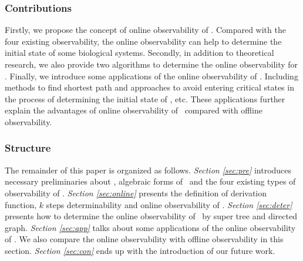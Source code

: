 \subsubsection*{Contributions}
Firstly, we propose the concept of online observability of \BCNs. Compared with the four existing observability, the online observability can help to determine the initial state of some biological systems. Secondly, in addition to theoretical research, we also provide two algorithms to determine the online observability for \BCNs. Finally, we introduce some applications of the online observability of \BCNs. Including methods to find shortest path and approaches to avoid entering critical states in the process of determining the initial state of \BCNs, etc.  These applications further explain the advantages of online observability of \BCNs\ compared with offline observability. %
\subsubsection*{Structure}
The remainder of this paper is organized as follows. {\em Section \ref{sec:pre}} introduces necessary preliminaries about \BCNs, algebraic forms of \BCNs\ and the four existing types of observability of  \BCNs. {\em Section \ref{sec:online}} presents the definition of derivation function, $k$ steps determinability and online observability of \BCNs. {\em Section \ref{sec:deter}} presents how to determine the online observability of \BCNs\ by super tree and directed graph. {\em Section \ref{sec:app}} talks about some applications of the online observability of \BCNs. We also compare the online observability with offline observability in this section. {\em Section \ref{sec:con}} ends up  with the introduction of our future work.


